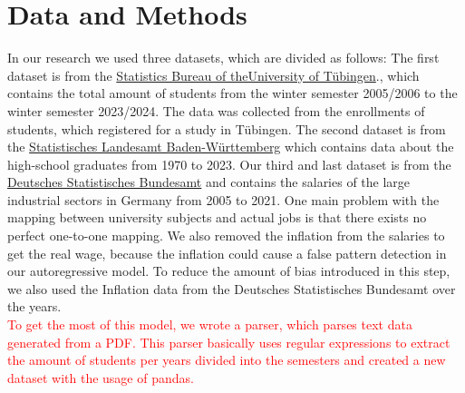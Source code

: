 \documentclass{article}
\theoremstyle{plain}
\theoremstyle{definition}
\theoremstyle{remark}
\begin{document}
\section{Data and Methods}\label{sec:methods}
In our research we used three datasets, which are divided as follows: The first dataset is from the \href{https://uni-tuebingen.de/einrichtungen/verwaltung/iv-studierende/studierendenabteilung/statistiken/}{Statistics Bureau of theUniversity of Tübingen}., which contains the
total amount of students from the winter semester 2005/2006 to the winter semester 2023/2024. The data was collected from the enrollments of students, which registered 
for a study in Tübingen.
The second dataset is from the \href{https://www.statistik-bw.de/BildungKultur/SchulenAllgem/LRt0302.jsp}{Statistisches Landesamt Baden-Württemberg} which contains data about the high-school graduates from 1970 to 2023.
Our third and last dataset is from the \href{https://www-genesis.destatis.de/genesis//online?operation=table&code=62321-0001&bypass=true&levelindex=0&levelid=1702307320529#abreadcrumb}{Deutsches Statistisches Bundesamt} and contains the salaries of the large industrial sectors in Germany from 2005 to 2021. 
One main problem with the mapping between university subjects and actual jobs is that there exists no perfect one-to-one mapping. 
We also removed the inflation from the salaries to get the real wage, because the inflation could 
cause a false pattern detection in our autoregressive model. 
To reduce the amount of bias introduced in this step, we also used the Inflation data from the Deutsches Statistisches Bundesamt over the years.\\

\textcolor{red}{To get the most of this model, we wrote a parser, which parses text data generated from a PDF. This parser basically uses regular expressions to extract the amount of students
per years divided into the semesters and created a new dataset with the usage of pandas.\\}
\end{document}
